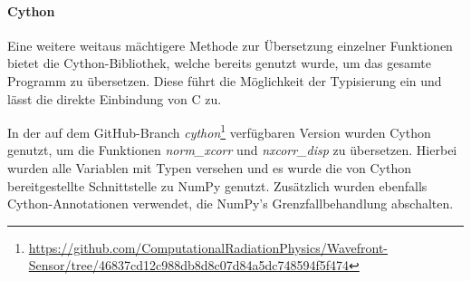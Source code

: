 \paragraph{Cython}

Eine weitere weitaus mächtigere Methode zur Übersetzung einzelner Funktionen bietet die Cython-Bibliothek, welche bereits genutzt wurde, um das gesamte Programm zu übersetzen. Diese führt die Möglichkeit der Typisierung ein und lässt die direkte Einbindung von C zu. 

In der auf dem GitHub-Branch \textit{cython}\footnote{\url{https://github.com/ComputationalRadiationPhysics/Wavefront-Sensor/tree/46837cd12c988db8d8c07d84a5dc748594f5f474}} verfügbaren Version wurden Cython genutzt, um die Funktionen \textit{norm\_xcorr} und \textit{nxcorr\_disp} zu übersetzen. Hierbei wurden alle Variablen mit Typen versehen und es wurde die von Cython bereitgestellte Schnittstelle zu NumPy genutzt. Zusätzlich wurden ebenfalls Cython-Annotationen verwendet, die NumPy's Grenzfallbehandlung abschalten. 